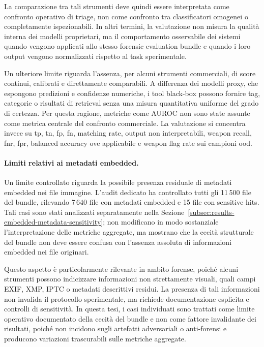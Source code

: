 La comparazione tra tali strumenti deve quindi essere interpretata come confronto
operativo di triage, non come confronto tra classificatori omogenei o
completamente ispezionabili. In altri termini, la valutazione non misura la
qualità interna dei modelli proprietari, ma il comportamento osservabile dei
sistemi quando vengono applicati allo stesso forensic evaluation bundle e quando
i loro output vengono normalizzati rispetto al task sperimentale.

Un ulteriore limite riguarda l'assenza, per alcuni strumenti commerciali, di
score continui, calibrati e direttamente comparabili. A differenza dei modelli
proxy, che espongono predizioni e confidenze numeriche, i tool black-box possono
fornire tag, categorie o risultati di retrieval senza una misura quantitativa
uniforme del grado di certezza. Per questa ragione, metriche come AUROC non sono
state assunte come metrica centrale del confronto commerciale. La valutazione si
concentra invece su \gls{tp}, \gls{tn}, \gls{fp}, \gls{fn}, matching rate,
output non interpretabili, weapon recall, \gls{fnr}, \gls{fpr}, balanced
accuracy ove applicabile e weapon flag rate sui campioni \gls{ood}.

\paragraph{Limiti relativi ai metadati embedded.}

Un limite controllato riguarda la possibile presenza residuale di metadati
embedded nei file immagine. L'audit dedicato ha controllato tutti gli 11\,500
file del bundle, rilevando 7\,640 file con metadati embedded e 15 file con
sensitive hits. Tali casi sono stati analizzati separatamente nella
Sezione~\ref{subsec:results-embedded-metadata-sensitivity}; non modificano in
modo sostanziale l'interpretazione delle metriche aggregate, ma mostrano che la
cecità strutturale del bundle non deve essere confusa con l'assenza assoluta di
informazioni embedded nei file originari.

Questo aspetto è particolarmente rilevante in ambito forense, poiché alcuni
strumenti possono indicizzare informazioni non strettamente visuali, quali campi
EXIF, XMP, IPTC o metadati descrittivi residui. La presenza di tali informazioni
non invalida il protocollo sperimentale, ma richiede documentazione esplicita e
controlli di sensitività. In questa tesi, i casi individuati sono trattati come
limite operativo documentato della cecità del bundle e non come fattore
invalidante dei risultati, poiché non incidono sugli artefatti adversariali o
anti-forensi e producono variazioni trascurabili sulle metriche aggregate.

